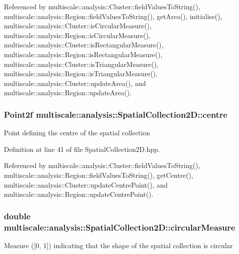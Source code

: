 Referenced by multiscale\-::analysis\-::\-Cluster\-::field\-Values\-To\-String(), multiscale\-::analysis\-::\-Region\-::field\-Values\-To\-String(), get\-Area(), initialise(), multiscale\-::analysis\-::\-Cluster\-::is\-Circular\-Measure(), multiscale\-::analysis\-::\-Region\-::is\-Circular\-Measure(), multiscale\-::analysis\-::\-Cluster\-::is\-Rectangular\-Measure(), multiscale\-::analysis\-::\-Region\-::is\-Rectangular\-Measure(), multiscale\-::analysis\-::\-Cluster\-::is\-Triangular\-Measure(), multiscale\-::analysis\-::\-Region\-::is\-Triangular\-Measure(), multiscale\-::analysis\-::\-Cluster\-::update\-Area(), and multiscale\-::analysis\-::\-Region\-::update\-Area().

\hypertarget{classmultiscale_1_1analysis_1_1SpatialCollection2D_afe9ef6b70ff53161cb02749444ae372c}{
\subsubsection[{centre}]{\setlength{\rightskip}{0pt plus 5cm}Point2f multiscale\-::analysis\-::\-Spatial\-Collection2\-D\-::centre\hspace{0.3cm}{\ttfamily [protected]}}}\label{classmultiscale_1_1analysis_1_1SpatialCollection2D_afe9ef6b70ff53161cb02749444ae372c}
Point defining the centre of the spatial collection 

Definition at line 41 of file Spatial\-Collection2\-D.\-hpp.



Referenced by multiscale\-::analysis\-::\-Cluster\-::field\-Values\-To\-String(), multiscale\-::analysis\-::\-Region\-::field\-Values\-To\-String(), get\-Centre(), multiscale\-::analysis\-::\-Cluster\-::update\-Centre\-Point(), and multiscale\-::analysis\-::\-Region\-::update\-Centre\-Point().

\hypertarget{classmultiscale_1_1analysis_1_1SpatialCollection2D_a4c58c82dd3d67d670b554bfaeb2b19ba}{
\subsubsection[{circular\-Measure}]{\setlength{\rightskip}{0pt plus 5cm}double multiscale\-::analysis\-::\-Spatial\-Collection2\-D\-::circular\-Measure\hspace{0.3cm}{\ttfamily [protected]}}}\label{classmultiscale_1_1analysis_1_1SpatialCollection2D_a4c58c82dd3d67d670b554bfaeb2b19ba}
Measure (\mbox{[}0, 1\mbox{]}) indicating that the shape of the spatial collection is circular 

